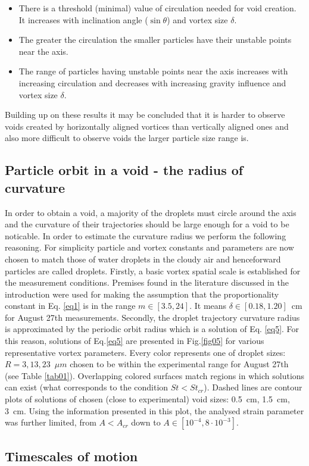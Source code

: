 \documentclass[../main.tex]{subfiles}
\begin{document}
\begin{itemize}
\item There is a threshold (minimal) value of circulation needed for void creation. It increases with inclination angle ($\sin \theta$) and vortex size $\delta$.
\item The greater the circulation the smaller particles  have their unstable points near the axis.
\item The range of particles having unstable points near the axis increases with increasing circulation and decreases with increasing gravity influence and vortex size $\delta$.
\end{itemize}

\noindent Building up on these results it may be concluded that it is harder to observe voids created by horizontally aligned vortices than vertically aligned ones and also more difficult to observe voids the larger particle size range is.\\

\subsection{Particle orbit in a void - the radius of curvature}
\label{ssec:par}
In order to obtain a void, a majority of the droplets must circle around the axis and the curvature of their trajectories should be large enough for a void to be noticable. In order to estimate the curvature radius we perform the following reasoning. For simplicity particle and vortex constants and parameters are now chosen to match those of water droplets in the cloudy air and henceforward particles are called droplets.
Firstly, a basic vortex spatial scale is established for the measurement conditions. Premises found in the literature discussed in the introduction were used for making the assumption that the proportionality constant in Eq. \ref{eq1} is in the range $m\in[3.5, 24]$. It means $\delta \in [0.18,1.20]$~cm for August 27th measurements.
Secondly, the droplet trajectory curvature radius is approximated by the periodic orbit radius which is a solution of Eq. \ref{eq5}. For this reason, solutions of Eq.\ref{eq5} are presented in Fig.\ref{fig05} for various representative vortex parameters. Every color represents one of droplet sizes: $R=3,13,23$~$\mu m$ chosen to be within the experimental range for August 27th (see Table \ref{tab01}). Overlapping colored surfaces match regions in which solutions can exist (what corresponds to the condition $St<St_{cr}$). Dashed lines are contour plots of solutions of chosen (close to experimental) void sizes: 0.5~cm, 1.5~cm, 3~cm. Using the information presented in this plot, the analysed strain parameter was further limited, from $A<A_{cr}$ down to $A \in [10^{-4}, 8\cdot10^{-3}]$.



\subsection{Timescales of motion}
\end{document}

